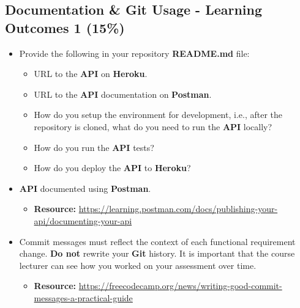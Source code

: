\documentclass{article}
\begin{document}
\subsection*{Documentation \& Git Usage - Learning Outcomes 1 (15\%)}
\begin{itemize}
	\item Provide the following in your repository \textbf{README.md} file:
	      \begin{itemize}
		      \item URL to the \textbf{API} on \textbf{Heroku}.
		      \item URL to the \textbf{API} documentation on \textbf{Postman}.
		      \item How do you setup the environment for development, i.e., after the repository is cloned, what do you need to run the \textbf{API} locally?
					\item How do you run the \textbf{API} tests?
					\item How do you deploy the \textbf{API} to \textbf{Heroku}?
	      \end{itemize}
			\end{itemize}
			\begin{itemize}
	\item \textbf{API} documented using \textbf{Postman}.
	\begin{itemize}
		\item \textbf{Resource:} \footnotesize\href{https://learning.postman.com/docs/publishing-your-api/documenting-your-api}{https://learning.postman.com/docs/publishing-your-api/documenting-your-api}
	\end{itemize}
	\item Commit messages must reflect the context of each functional requirement change. \textbf{Do not} rewrite your \textbf{Git} history. It is important that the course lecturer can see how you worked on your assessment over time.
	      \begin{itemize}
		      \item \textbf{Resource:} \footnotesize\href{https://freecodecamp.org/news/writing-good-commit-messages-a-practical-guide}{https://freecodecamp.org/news/writing-good-commit-messages-a-practical-guide}
	      \end{itemize}
\end{itemize}
\end{document}
